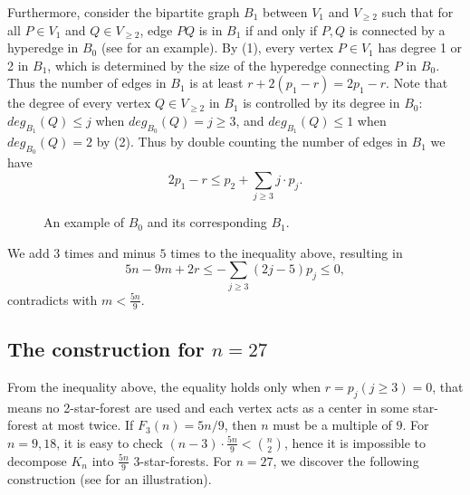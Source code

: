 \documentclass{article}
\begin{document}
Furthermore, consider the bipartite graph $B_1$ between $V_1$ and $V_{\ge 2}$ such that for all $P\in V_1$ and $Q\in V_{\ge2}$, edge $PQ$ is in $B_1$ if and only if $P, Q$ is connected by a hyperedge in $B_0$ (see  for an example). By (1), every vertex $P\in V_1$ has degree 1 or 2 in $B_1$, which is determined by the size of the hyperedge connecting $P$ in $B_0$. Thus the number of edges in $B_1$ is at least $r+2(p_1-r)=2p_1-r$. Note that the degree of every vertex $Q\in V_{\ge 2}$ in $B_1$ is controlled by its degree in $B_0$: $deg_{B_1}(Q)\le j$ when $deg_{B_0}(Q)=j\ge3$, and $deg_{B_1}(Q)\le 1$ when $deg_{B_0}(Q)=2$ by (2). Thus by double counting the number of edges in $B_1$ we have
$$
2p_1-r\leqslant p_2+\sum_{j\geqslant3}j\cdot p_j.
$$
\begin{figure}[h]
		\centering
		\caption{An example of $B_0$ and its corresponding $B_1$.}
            \label{figure:B1}
\end{figure}
We add $3$ times  and minus $5$ times  to the inequality above, resulting in
$$
5n-9m+2r\leqslant-\sum_{j\geqslant3}(2j-5)p_j\leqslant0,
$$
contradicts with $m<\frac{5n}{9}$.
	
\subsection{The construction for $n=27$}\label{subsec:n=27}
From the inequality above, the equality holds only when $r=p_j(j\geqslant3)=0$, that means no 2-star-forest are used and each vertex acts as a center in some star-forest at most twice. If $F_3(n)=5n/9$, then $n$ must be a multiple of $9$. For $n=9,18$, it is easy to check $(n-3)\cdot \frac{5n}{9}<\binom{n}{2}$, hence it is impossible to decompose $K_n$ into $\frac{5n}{9}$ 3-star-forests. For $n=27$, we discover the following construction (see  for an illustration).
	
\end{document}
